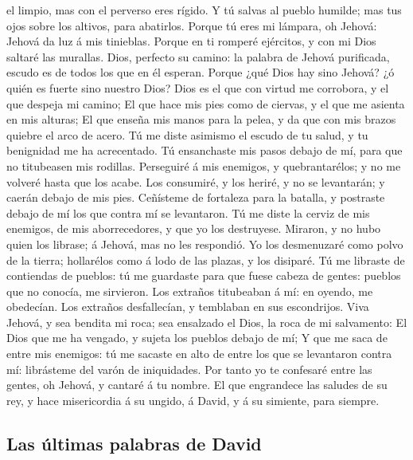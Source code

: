 el limpio, mas con el perverso eres rígido.  Y tú salvas al
pueblo humilde; mas tus ojos sobre los altivos, para abatirlos.
 Porque tú eres mi lámpara, oh Jehová: Jehová da luz á mis
tinieblas.  Porque en ti romperé ejércitos, y con mi Dios
saltaré las murallas.  Dios, perfecto su camino: la palabra
de Jehová purificada, escudo es de todos los que en él esperan.
 Porque ¿qué Dios hay sino Jehová? ¿ó quién es fuerte sino
nuestro Dios?  Dios es el que con virtud me corrobora, y el
que despeja mi camino;  El que hace mis pies como de
ciervas, y el que me asienta en mis alturas;  El que enseña
mis manos para la pelea, y da que con mis brazos quiebre el arco de
acero.  Tú me diste asimismo el escudo de tu salud, y tu
benignidad me ha acrecentado.  Tú ensanchaste mis pasos
debajo de mí, para que no titubeasen mis rodillas. 
Perseguiré á mis enemigos, y quebrantarélos; y no me volveré hasta que
los acabe.  Los consumiré, y los heriré, y no se
levantarán; y caerán debajo de mis pies.  Ceñísteme de
fortaleza para la batalla, y postraste debajo de mí los que contra mí se
levantaron.  Tú me diste la cerviz de mis enemigos, de mis
aborrecedores, y que yo los destruyese.  Miraron, y no hubo
quien los librase; á Jehová, mas no les respondió.  Yo los
desmenuzaré como polvo de la tierra; hollarélos como á lodo de las
plazas, y los disiparé.  Tú me libraste de contiendas de
pueblos: tú me guardaste para que fuese cabeza de gentes: pueblos que no
conocía, me sirvieron.  Los extraños titubeaban á mí: en
oyendo, me obedecían.  Los extraños desfallecían, y
temblaban en sus escondrijos.  Viva Jehová, y sea bendita
mi roca; sea ensalzado el Dios, la roca de mi salvamento: 
El Dios que me ha vengado, y sujeta los pueblos debajo de mí;
 Y que me saca de entre mis enemigos: tú me sacaste en alto
de entre los que se levantaron contra mí: librásteme del varón de
iniquidades.  Por tanto yo te confesaré entre las gentes,
oh Jehová, y cantaré á tu nombre.  El que engrandece las
saludes de su rey, y hace misericordia á su ungido, á David, y á su
simiente, para siempre.

\hypertarget{las-uxfaltimas-palabras-de-david}{%
\subsection{Las últimas palabras de
David}\label{las-uxfaltimas-palabras-de-david}}

